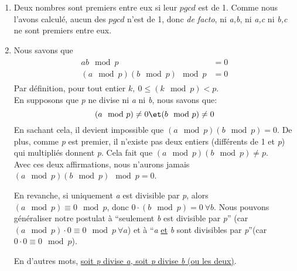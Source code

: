 \documentclass[10p,a4paper]{scrartcl}
\begin{document}
\begin{enumerate}
	\item 	Deux nombres sont premiers entre eux si leur $pgcd$ est de 1. Comme nous l'avons calculé, aucun des $pgcd$ n'est de 1, donc \textit{de facto}, ni \textit{a,b}, ni \textit{a,c} ni \textit{b,c} ne sont premiers entre eux.
	
	\item 	Nous savons que 
			\begin{align*}
				\begin{split} 
					ab \mod p &=0\\
					(a \mod p)(b\mod p)\mod p &= 0
				\end{split}
			\end{align*}
			Par définition, pour tout entier $k,\ 0 \leq (k\mod p) < p$. \\
			En supposons que \textit{p} ne divise ni \textit{a} ni \textit{b}, nous savons que:
			\begin{equation*}
				(a \mod p) \neq 0 \et (b \mod p) \neq 0
			\end{equation*}
			En sachant cela, il devient impossible que  $(a \mod p)(b\mod p) = 0$. De plus, comme \textit{p} est premier, il n'existe pas deux entiers (différents de 1 et \textit{p}) qui multipliés donnent \textit{p}. Cela fait que $(a\mod p)(b\mod p) \neq p$.\\
			Avec ces deux affirmations, nous n'aurons jamais $(a \mod p)(b\mod p)\mod p = 0 $.
			
			En revanche, si uniquement \textit{a} est divisible par \textit{p}, alors $(a \mod p) \equiv 0 \mod p$, donc $0\cdot (b\mod p) = 0\ \forall b$. Nous pouvons généraliser notre postulat à \enquote{seulement \textit{b} est divisible par \textit{p}} (car $(a\mod p)\cdot 0 \equiv 0\mod p\ \forall a$) et à \enquote{\textit{a} \underline{et} \textit{b} sont divisibles par \textit{p}}(car $0\cdot 0 \equiv 0\mod p$).
			
			En d'autres mots, \uline{soit \textit{p} divise \textit{a}, soit \textit{p} divise \textit{b} (ou les deux)}.
\end{enumerate}
\end{document}
